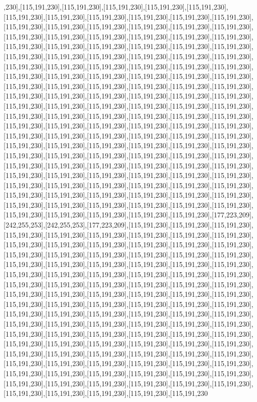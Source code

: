 ,230],[115,191,230],[115,191,230],[115,191,230],[115,191,230],[115,191,230],[115,191,230],[115,191,230],[115,191,230],[115,191,230],[115,191,230],[115,191,230],[115,191,230],[115,191,230],[115,191,230],[115,191,230],[115,191,230],[115,191,230],[115,191,230],[115,191,230],[115,191,230],[115,191,230],[115,191,230],[115,191,230],[115,191,230],[115,191,230],[115,191,230],[115,191,230],[115,191,230],[115,191,230],[115,191,230],[115,191,230],[115,191,230],[115,191,230],[115,191,230],[115,191,230],[115,191,230],[115,191,230],[115,191,230],[115,191,230],[115,191,230],[115,191,230],[115,191,230],[115,191,230],[115,191,230],[115,191,230],[115,191,230],[115,191,230],[115,191,230],[115,191,230],[115,191,230],[115,191,230],[115,191,230],[115,191,230],[115,191,230],[115,191,230],[115,191,230],[115,191,230],[115,191,230],[115,191,230],[115,191,230],[115,191,230],[115,191,230],[115,191,230],[115,191,230],[115,191,230],[115,191,230],[115,191,230],[115,191,230],[115,191,230],[115,191,230],[115,191,230],[115,191,230],[115,191,230],[115,191,230],[115,191,230],[115,191,230],[115,191,230],[115,191,230],[115,191,230],[115,191,230],[115,191,230],[115,191,230],[115,191,230],[115,191,230],[115,191,230],[115,191,230],[115,191,230],[115,191,230],[115,191,230],[115,191,230],[115,191,230],[115,191,230],[115,191,230],[115,191,230],[115,191,230],[115,191,230],[115,191,230],[115,191,230],[115,191,230],[115,191,230],[115,191,230],[115,191,230],[115,191,230],[115,191,230],[115,191,230],[115,191,230],[115,191,230],[115,191,230],[115,191,230],[115,191,230],[115,191,230],[115,191,230],[115,191,230],[115,191,230],[115,191,230],[115,191,230],[115,191,230],[115,191,230],[115,191,230],[115,191,230],[115,191,230],[115,191,230],[115,191,230],[115,191,230],[115,191,230],[115,191,230],[115,191,230],[115,191,230],[115,191,230],[115,191,230],[177,223,209],[242,255,253],[242,255,253],[177,223,209],[115,191,230],[115,191,230],[115,191,230],[115,191,230],[115,191,230],[115,191,230],[115,191,230],[115,191,230],[115,191,230],[115,191,230],[115,191,230],[115,191,230],[115,191,230],[115,191,230],[115,191,230],[115,191,230],[115,191,230],[115,191,230],[115,191,230],[115,191,230],[115,191,230],[115,191,230],[115,191,230],[115,191,230],[115,191,230],[115,191,230],[115,191,230],[115,191,230],[115,191,230],[115,191,230],[115,191,230],[115,191,230],[115,191,230],[115,191,230],[115,191,230],[115,191,230],[115,191,230],[115,191,230],[115,191,230],[115,191,230],[115,191,230],[115,191,230],[115,191,230],[115,191,230],[115,191,230],[115,191,230],[115,191,230],[115,191,230],[115,191,230],[115,191,230],[115,191,230],[115,191,230],[115,191,230],[115,191,230],[115,191,230],[115,191,230],[115,191,230],[115,191,230],[115,191,230],[115,191,230],[115,191,230],[115,191,230],[115,191,230],[115,191,230],[115,191,230],[115,191,230],[115,191,230],[115,191,230],[115,191,230],[115,191,230],[115,191,230],[115,191,230],[115,191,230],[115,191,230],[115,191,230],[115,191,230],[115,191,230],[115,191,230],[115,191,230],[115,191,230],[115,191,230],[115,191,230],[115,191,230],[115,191,230],[115,191,230],[115,191,230],[115,191,230],[115,191,230],[115,191,230],[115,191,230],[115,191,230],[115,191,230],[115,191,230],[115,191,230],[115,191,230],[115,191,230],[115,191,230],[115,191,230],[115,191,230],[115,191,230],[115,191,230],[115,191,230],[115,191,230],[115,191,230